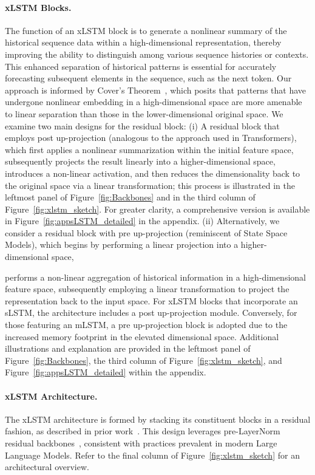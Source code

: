 \paragraph{xLSTM Blocks.}
\label{sec:xLSTMblock}
The function of an xLSTM block is to generate a nonlinear summary of the historical sequence data within a high-dimensional representation, thereby improving the ability to distinguish among various sequence histories or contexts. This enhanced separation of historical patterns is essential for accurately forecasting subsequent elements in the sequence, such as the next token. Our approach is informed by Cover’s Theorem~\citep{Cover:65}, which posits that patterns that have undergone nonlinear embedding in a high-dimensional space are more amenable to linear separation than those in the lower-dimensional original space. We examine two main designs for the residual block: (i) A residual block that employs post up-projection (analogous to the approach used in Transformers), which first applies a nonlinear summarization within the initial feature space, subsequently projects the result linearly into a higher-dimensional space, introduces a non-linear activation, and then reduces the dimensionality back to the original space via a linear transformation; this process is illustrated in the leftmost panel of Figure~\ref{fig:Backbones} and in the third column of Figure~\ref{fig:xlstm_sketch}. For greater clarity, a comprehensive version is available in Figure~\ref{fig:appsLSTM_detailed} in the appendix. (ii) Alternatively, we consider a residual block with pre up-projection (reminiscent of State Space Models), which begins by performing a linear projection into a higher-dimensional space,

performs a non-linear aggregation of historical information in a high-dimensional feature space, subsequently employing a linear transformation to project the representation back to the input space. For xLSTM blocks that incorporate an sLSTM, the architecture includes a post up-projection module. Conversely, for those featuring an mLSTM, a pre up-projection block is adopted due to the increased memory footprint in the elevated dimensional space. Additional illustrations and explanation are provided in the leftmost panel of Figure~\ref{fig:Backbones}, the third column of Figure~\ref{fig:xlstm_sketch}, and Figure~\ref{fig:appsLSTM_detailed} within the appendix.

\paragraph{xLSTM Architecture. }
\label{sec:xLSTMarchitecure}
The xLSTM architecture is formed by stacking its constituent blocks in a residual fashion, as described in prior work~\citep{Srivastava:15,He:16}. This design leverages pre-LayerNorm residual backbones~\citep{Ba:16b}, consistent with practices prevalent in modern Large Language Models. Refer to the final column of Figure~\ref{fig:xlstm_sketch} for an architectural overview.

